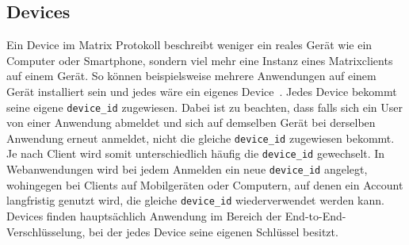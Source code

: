     \subsection{Devices}
    Ein Device im Matrix Protokoll beschreibt weniger ein reales Gerät wie ein Computer oder Smartphone, sondern viel mehr eine Instanz eines Matrixclients auf einem Gerät.
    So können beispielsweise mehrere Anwendungen auf einem Gerät installiert sein und jedes wäre ein eigenes Device~\cite{devices}.
    Jedes Device bekommt seine eigene \texttt{device\_id} zugewiesen.
    Dabei ist zu beachten, dass falls sich ein User von einer Anwendung abmeldet und sich auf demselben Gerät bei derselben Anwendung erneut anmeldet, nicht die gleiche \texttt{device\_id} zugewiesen bekommt.
    Je nach Client wird somit unterschiedlich häufig die \texttt{device\_id} gewechselt.
    In Webanwendungen wird bei jedem Anmelden ein neue \texttt{device\_id} angelegt, wohingegen bei Clients auf Mobilgeräten oder Computern, auf denen ein Account langfristig genutzt wird, die gleiche \texttt{device\_id} wiederverwendet werden kann.
    Devices finden hauptsächlich Anwendung im Bereich der End-to-End-Verschlüsselung, bei der jedes Device seine eigenen Schlüssel besitzt.

    \newpage
